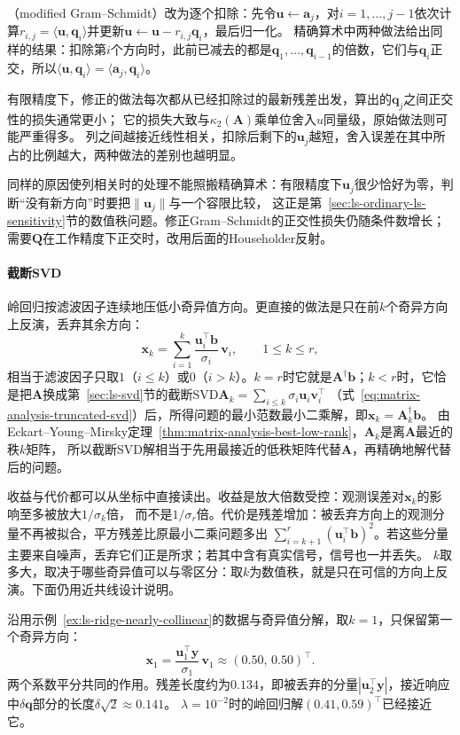 （modified Gram--Schmidt）改为逐个扣除：先令$\bm u\leftarrow\bm a_j$，对$i=1,\ldots,j-1$依次计算$r_{i,j}=\langle\bm u,\bm q_i\rangle$并更新$\bm u\leftarrow\bm u-r_{i,j}\bm q_i$，最后归一化。
精确算术中两种做法给出同样的结果：扣除第$i$个方向时，此前已减去的都是$\bm q_1,\ldots,\bm q_{i-1}$的倍数，它们与$\bm q_i$正交，所以$\langle\bm u,\bm q_i\rangle=\langle\bm a_j,\bm q_i\rangle$。

有限精度下，修正的做法每次都从已经扣除过的最新残差出发，算出的$\bm q_j$之间正交性的损失通常更小；
它的损失大致与$\kappa_2(\bm A)$乘单位舍入$u$同量级，原始做法则可能严重得多。
列之间越接近线性相关，扣除后剩下的$\bm u_j$越短，舍入误差在其中所占的比例越大，两种做法的差别也越明显。

同样的原因使列相关时的处理不能照搬精确算术：有限精度下$\bm u_j$很少恰好为零，判断“没有新方向”时要把$\lVert\bm u_j\rVert$与一个容限比较，
这正是第~\ref{sec:ls-ordinary-ls-sensitivity}节的数值秩问题。修正Gram--Schmidt的正交性损失仍随条件数增长；
需要$\bm Q$在工作精度下正交时，改用后面的Householder反射。

\paragraph{截断SVD}

岭回归按滤波因子连续地压低小奇异值方向。更直接的做法是只在前$k$个奇异方向上反演，丢弃其余方向：
\[
 \bm x_k=\sum_{i=1}^k\frac{\bm u_i^\top\bm b}{\sigma_i}\,\bm v_i,\qquad 1\leq k\leq r ,
\]
相当于滤波因子只取$1$（$i\leq k$）或$0$（$i>k$）。$k=r$时它就是$\bm A^\dagger\bm b$；$k<r$时，它恰是把$\bm A$换成第~\ref{sec:ls-svd}节的截断SVD$\bm A_k=\sum_{i\leq k}\sigma_i\bm u_i\bm v_i^\top$
（式~\eqref{eq:matrix-analysis-truncated-svd}）后，所得问题的最小范数最小二乘解，即$\bm x_k=\bm A_k^\dagger\bm b$。
由Eckart--Young--Mirsky定理~\ref{thm:matrix-analysis-best-low-rank}，$\bm A_k$是离$\bm A$最近的秩$k$矩阵，
所以截断SVD解相当于先用最接近的低秩矩阵代替$\bm A$，再精确地解代替后的问题。

收益与代价都可以从坐标中直接读出。收益是放大倍数受控：观测误差对$\bm x_k$的影响至多被放大$1/\sigma_k$倍，
而不是$1/\sigma_r$倍。代价是残差增加：被丢弃方向上的观测分量不再被拟合，平方残差比原最小二乘问题多出
$\sum_{i=k+1}^r(\bm u_i^\top\bm b)^2$。若这些分量主要来自噪声，丢弃它们正是所求；若其中含有真实信号，信号也一并丢失。
$k$取多大，取决于哪些奇异值可以与零区分：取$k$为数值秩，就是只在可信的方向上反演。下面仍用近共线设计说明。

\begin{example}[近共线设计上的截断SVD]
\label{ex:ls-tsvd-nearly-collinear}
沿用示例~\ref{ex:ls-ridge-nearly-collinear}的数据与奇异值分解，取$k=1$，只保留第一个奇异方向：
\[
 \bm x_1=\frac{\bm u_1^\top\bm y}{\sigma_1}\,\bm v_1\approx(0.50,\,0.50)^\top .
\]
两个系数平分共同的作用。残差长度约为$0.134$，即被丢弃的分量$|\bm u_2^\top\bm y|$，接近响应中$\delta\bm q$部分的长度$\delta\sqrt2\approx0.141$。
$\lambda=10^{-2}$时的岭回归解$(0.41,0.59)^\top$已经接近它。
\end{example}

